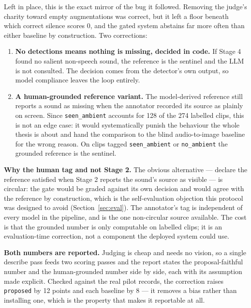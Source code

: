 \documentclass[11pt,a4paper]{article}
\begin{document}
Left in place, this is the exact mirror of the bug it followed. Removing the judge's charity toward
empty augmentations was correct, but it left a floor beneath which correct silence scores 0, and the
gated system abstains far more often than either baseline by construction. Two corrections:

\begin{enumerate}
  \item \textbf{No detections means nothing is missing, decided in code.} If Stage 4 found no salient
    non-speech sound, the reference is the sentinel and the LLM is not consulted. The decision comes
    from the detector's own output, so model compliance leaves the loop entirely.
  \item \textbf{A human-grounded reference variant.} The model-derived reference still reports a
    sound as missing when the annotator recorded its source as plainly on screen. Since
    \texttt{seen\_ambient} accounts for 128 of the 274 labelled clips, this is not an edge case: it
    would systematically punish the behaviour the whole thesis is about and hand the comparison to
    the blind audio-to-image baseline for the wrong reason. On clips tagged \texttt{seen\_ambient} or
    \texttt{no\_ambient} the grounded reference is the sentinel.
\end{enumerate}

\textbf{Why the human tag and not Stage 2.} The obvious alternative --- declare the reference
satisfied when Stage 2 reports the sound's source as visible --- is circular: the gate would be
graded against its own decision and would agree with the reference by construction, which is the
self-evaluation objection this protocol was designed to avoid (Section~\ref{sec:eval}). The
annotator's tag is independent of every model in the pipeline, and is the one non-circular source
available. The cost is that the grounded number is only computable on labelled clips; it is an
evaluation-time correction, not a component the deployed system could use.

\textbf{Both numbers are reported.} Judging is cheap and needs no vision, so a single describe pass
feeds two scoring passes and the report states the proposal-faithful number and the human-grounded
number side by side, each with its assumption made explicit. Checked against the real pilot records,
the correction raises \texttt{proposed} by 12 points and each baseline by 8 --- it removes a bias
rather than installing one, which is the property that makes it reportable at all.
\end{document}
